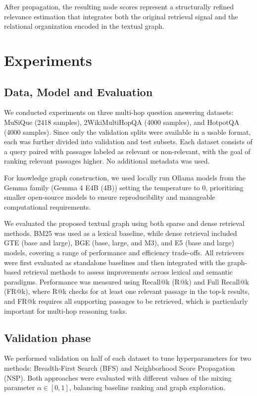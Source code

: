 \documentclass[11pt]{article}
\begin{document}
After propagation, the resulting node scores represent a structurally refined relevance estimation that integrates both the original retrieval signal and the relational organization encoded in the textual graph.





\section{Experiments}


\subsection{Data, Model and Evaluation}


We conducted experiments on three multi-hop question answering datasets: MuSiQue (2418 samples), 2WikiMultiHopQA (4000 samples), and HotpotQA (4000 samples). Since only the validation splits were available in a usable format, each was further divided into validation and test subsets. Each dataset consists of a query paired with passages labeled as relevant or non-relevant, with the goal of ranking relevant passages higher. No additional metadata was used.

For knowledge graph construction, we used locally run Ollama models from the Gemma family (Gemma 4 E4B (4B)) setting the temperature to 0, prioritizing smaller open-source models to ensure reproducibility and manageable computational requirements.

We evaluated the proposed textual graph using both sparse and dense retrieval methods. BM25 was used as a lexical baseline, while dense retrieval included GTE (base and large), BGE (base, large, and M3), and E5 (base and large) models, covering a range of performance and efficiency trade-offs.
All retrievers were first evaluated as standalone baselines and then integrated with the graph-based retrieval methods to assess improvements across lexical and semantic paradigms.
Performance was measured using Recall@k (R@k) and Full Recall@k (FR@k), where R@k checks for at least one relevant passage in the top-k results, and FR@k requires all supporting passages to be retrieved, which is particularly important for multi-hop reasoning tasks.
\subsection{Validation phase}
We performed validation on half of each dataset to tune hyperparameters for two methods: Breadth-First Search (BFS) and Neighborhood Score Propagation (NSP). Both approaches were evaluated with different values of the mixing parameter $\alpha \in [0,1]$, balancing baseline ranking and graph exploration.
\end{document}
